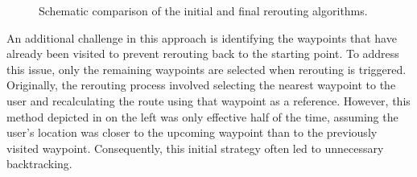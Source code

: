 \begin{figure}[t]
\centering
{}
\caption{Schematic comparison of the initial and final rerouting algorithms.}
\label{fig:rerouting-strategy-comparison}
\end{figure}

An additional challenge in this approach is identifying the waypoints that have already been visited to prevent rerouting back to the starting point. To address this issue, only the remaining waypoints are selected when rerouting is triggered. Originally, the rerouting process involved selecting the nearest waypoint to the user and recalculating the route using that waypoint as a reference. However, this method depicted in  on the left was only effective half of the time, assuming the user's location was closer to the upcoming waypoint than to the previously visited waypoint. Consequently, this initial strategy often led to unnecessary backtracking.

